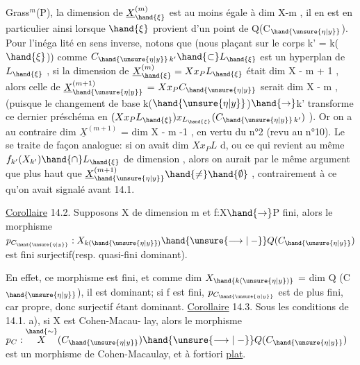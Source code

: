 
Grass$^{m}$(P), la dimension de $\underline{X}^{(m)}_{\hand{\xi}}$ est au moins égale à dim X-m , il en est
en particulier ainsi lorsque $\hand{\xi}$ provient d'un point de Q(C$_{\hand{\unsure{\eta|y}}}$). Pour l'inéga
lité en sens inverse, notons que (nous plaçant sur le corps k' = k($\hand{\xi}$))
comme $C_{\hand{\unsure{\eta|y}}\,k'} \hand{\subset} L_{\hand{\xi}}$ est  un hyperplan de $L_{\hand{\xi}}$ , si la dimension de
$\underline{X}^{(m)}_{\hand{\xi}} = Xx_{P}L_{\hand{\xi}}$ était \hand{$\geqslant$} dim X - m + 1 , alors celle de $\underline{X}^{(m+1)}_{\hand{\unsure{\eta|y}}}$ =
$Xx_{P}C_{\hand{\unsure{\eta|y}}}$ serait \hand{$\geqslant$} dim X - m \xout{+}, (puisque le changement de base k($\hand{\unsure{\eta|y}}$)$\hand{\to}$k'
transforme ce dernier préschéma en $(Xx_{P}L_{\hand{\xi}})x_{L_{\hand{\xi}}}(C_{\hand{\unsure{\eta|y}}\,k'})$ ). Or on a au
contraire  dim $\underline{X}^{(m+1)}$ = dim X - m -1 
, en vertu du n°2 (revu au n°10).
Le   se traite
de façon analogue: si on avait dim $Xx_{P}L$ \hand{$\geqslant$} d,  ou
ce qui revient au même  $f_{k'}(X_{k'}) \hand{\cap} L_{\hand{\xi}}$ de dimension \hand{$\geqslant$},
alors on aurait par le même argument que plus  haut que
$\underline{X}^{(m+1)}_{\hand{\unsure{\eta|y}}} \hand{\neq} \hand{\emptyset}$ , contrairement à ce qu'on avait signalé avant 14.1.

\uline{Corollaire} 14.2. Supposons X de dimension m et f:X$\hand{\to}$P fini, alors
le morphisme $p_{C_{\hand{\unsure{\eta|y}}}} : X_{k(\hand{\unsure{\eta|y}})} \hand{\unsure{\longrightarrow|\relbar}} Q(C_{\hand{\unsure{\eta|y}}})$ est fini surjectif(resp. quasi-fini
dominant).

En effet, ce morphisme est fini, et comme dim $X_{\hand{k(\unsure{\eta|y})}}$ = dim Q (C$_{\hand{\unsure{\eta|y}}}$), il est
dominant;  si f est fini, $p_{C_{\hand{\unsure{\eta|y}}}}$ est de plus fini,
 car propre, donc surjectif étant dominant.
\uline{Corollaire} 14.3. Sous les conditions de 14.1. a), si X est Cohen-Macau-%
lay, alors le morphisme $p_{C} : \overset{\hand{\sim}}{X}(C_{\hand{\unsure{\eta|y}}}) \hand{\unsure{\longrightarrow|\relbar}} Q(C_{\hand{\unsure{\eta|y}}})$ est un morphisme de
Cohen-Macaulay, et à fortiori \uline{plat}.

